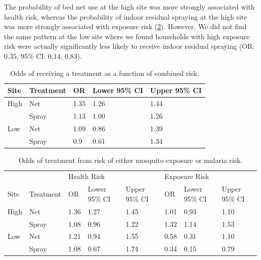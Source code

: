 \documentclass{article}\usepackage[]{graphicx}\usepackage[]{color}
\begin{document}
The probability of bed net use at the high site was more strongly associated with health risk,  whereas the probability of indoor residual spraying at the high site was more strongly associated with exposure risk (\ref{ORtrt}).  However,  We did not find the same pattern at the low site where we found households with high exposure risk were actually significantly less likely to receive indoor residual spraying (OR: 0.35,  95\% CI: 0.14,  0.83).  \\



\begin{table}[ht]
\centering
\begin{tabular}{lllll}
  \hline 
Site & Treatment & OR & Lower 95\% CI & Upper 95\% CI \\ 
  \hline
High & Net & 1.35 & 1.26 & 1.44 \\ 
   & Spray & 1.13 & 1.00 & 1.26 \\ 
  Low & Net & 1.09 & 0.86 & 1.39 \\ 
   & Spray & 0.9 & 0.61 & 1.34 \\ 
   \hline
\end{tabular}
\caption{Odds of receiving a treatment as a function of combined risk.} 
\label{ORcmb}
\end{table}





\begin{table}[ht]
\centering
\begin{tabular}{llllllll}
  \hline
 &  & \multicolumn{3}{l}{Health Risk} & \multicolumn{3}{l}{Exposure Risk}  \\ 
  
Site & Treatment & OR & Lower 95\% CI & Upper 95\% CI & OR & Lower 95\% CI & Upper 95\% CI \\ 
 \hline
  High & Net & 1.36 & 1.27 & 1.45 & 1.01 & 0.93 & 1.10 \\ 
   & Spray & 1.08 & 0.96 & 1.22 & 1.32 & 1.14 & 1.53 \\ 
  Low & Net & 1.21 & 0.94 & 1.55 & 0.58 & 0.31 & 1.10 \\ 
   & Spray & 1.08 & 0.67 & 1.74 & 0.34 & 0.15 & 0.79 \\ 
   \hline
\end{tabular}
\caption{Odds of treatment from risk of either mosquito exposure or malaria risk.} 
\label{ORtrt}
\end{table}
\end{document}
